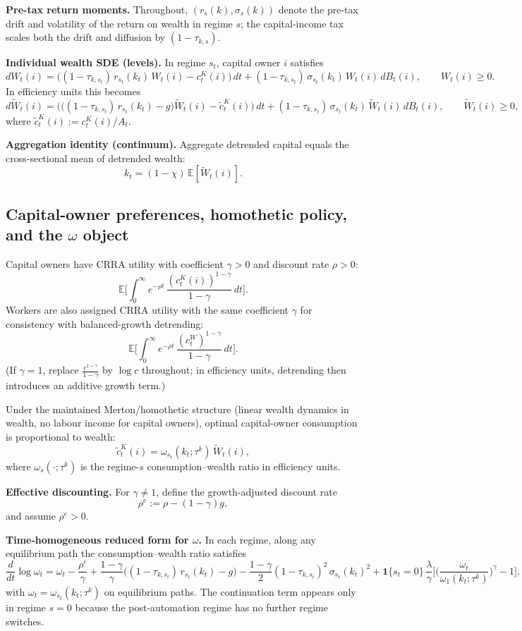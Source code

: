 \documentclass{article}
\begin{document}
\medskip
\noindent
\textbf{Pre-tax return moments.}
Throughout, $(r_s(k),\sigma_s(k))$ denote the pre-tax drift and volatility of the return on wealth in regime $s$;
the capital-income tax scales both the drift and diffusion by $(1-\tau_{k,s})$.

\medskip
\noindent
\textbf{Individual wealth SDE (levels).}
In regime $s_t$, capital owner $i$ satisfies
\[
dW_t(i) = \Big((1-\tau_{k,s_t})\, r_{s_t}(k_t)\, W_t(i) - c^K_t(i)\Big)\,dt
+ (1-\tau_{k,s_t})\,\sigma_{s_t}(k_t)\,W_t(i)\, dB_t(i),
\qquad
W_t(i)\ge 0.
\]
In efficiency units this becomes
\[
d\tilde W_t(i) =
\Big(\big((1-\tau_{k,s_t})\, r_{s_t}(k_t)-g\big)\tilde W_t(i) - \tilde c^K_t(i)\Big)\,dt
+ (1-\tau_{k,s_t})\,\sigma_{s_t}(k_t)\,\tilde W_t(i)\, dB_t(i),
\qquad
\tilde W_t(i)\ge 0,
\]
where $\tilde c^K_t(i):=c^K_t(i)/A_t$.

\medskip
\noindent
\textbf{Aggregation identity (continuum).}
Aggregate detrended capital equals the cross-sectional mean of detrended wealth:
\[
k_t = (1-\chi)\,\mathbb E[\tilde W_t(i)].
\]

\subsection{Capital-owner preferences, homothetic policy, and the $\omega$ object}

Capital owners have CRRA utility with coefficient $\gamma>0$ and discount rate $\rho>0$:
\[
\mathbb E\Big[\int_0^\infty e^{-\rho t}\,\frac{(c^K_t(i))^{1-\gamma}}{1-\gamma}\,dt\Big].
\]
Workers are also assigned CRRA utility with the same coefficient $\gamma$ for consistency with balanced-growth detrending:
\[
\mathbb E\Big[\int_0^\infty e^{-\rho t}\,\frac{(c^W_t)^{1-\gamma}}{1-\gamma}\,dt\Big].
\]
(If $\gamma=1$, replace $\frac{c^{1-\gamma}}{1-\gamma}$ by $\log c$ throughout; in efficiency units, detrending then introduces
an additive growth term.)

Under the maintained Merton/homothetic structure (linear wealth dynamics in wealth, no labour income for capital owners),
optimal capital-owner consumption is proportional to wealth:
\[
\tilde c^K_t(i) = \omega_{s_t}(k_t;\tau^k)\,\tilde W_t(i),
\]
where $\omega_s(\cdot;\tau^k)$ is the regime-$s$ consumption--wealth ratio in efficiency units.

\medskip
\noindent
\textbf{Effective discounting.}
For $\gamma\neq 1$, define the growth-adjusted discount rate
\[
\rho^e := \rho-(1-\gamma)g,
\]
and assume $\rho^e>0$.

\medskip
\noindent
\textbf{Time-homogeneous reduced form for $\omega$.}
In each regime, along any equilibrium path the consumption--wealth ratio satisfies
\[
\frac{d}{dt}\log \omega_t
=
\omega_t
-\frac{\rho^e}{\gamma}
+\frac{1-\gamma}{\gamma}\Big((1-\tau_{k,s_t})\,r_{s_t}(k_t)-g\Big)
-\frac{1-\gamma}{2}(1-\tau_{k,s_t})^2\,\sigma_{s_t}(k_t)^2
+\mathbf{1}\{s_t=0\}\,\frac{\lambda}{\gamma}
\Bigg[\Big(\frac{\omega_t}{\omega_1(k_t;\tau^k)}\Big)^\gamma-1\Bigg],
\]
with $\omega_t=\omega_{s_t}(k_t;\tau^k)$ on equilibrium paths. The continuation term appears only in regime $s=0$
because the post-automation regime has no further regime switches.
\end{document}
